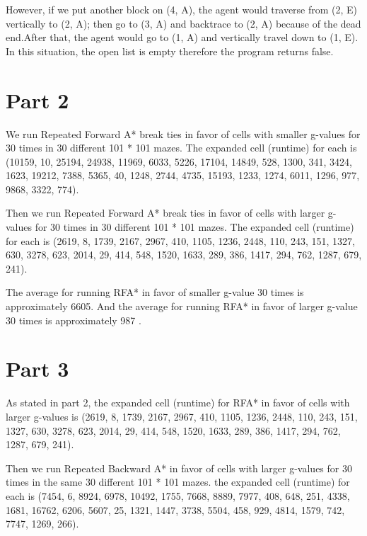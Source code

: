 \documentclass{article}
\begin{document}
However, if we put another block on (4, A), the agent would traverse from (2, E) vertically to (2, A); then go to (3, A) and backtrace to (2, A) because of the dead end.After that, the agent would go to (1, A) and vertically travel down to (1, E). In this situation, the open list is empty therefore the program returns false.

\section*{Part 2}
\hspace{5mm}

We run Repeated Forward A* break ties in favor of cells with smaller g-values for 30 times in 30 different 101 * 101 mazes. The expanded cell (runtime) for each is 
(10159, 10, 25194, 24938, 11969, 6033, 5226, 17104, 14849, 528, 1300, 341, 3424, 1623, 19212, 7388, 5365, 40, 1248, 2744, 4735, 15193, 1233, 1274, 6011, 1296, 977, 9868, 3322, 774).

Then we run Repeated Forward A* break ties in favor of cells with larger g-values for 30 times in 30 different 101 * 101 mazes. The expanded cell (runtime) for each is 
(2619, 8, 1739, 2167, 2967, 410, 1105, 1236, 2448, 110, 243, 151, 1327, 630, 3278, 623, 2014, 29, 414, 548, 1520, 1633, 289, 386, 1417, 294, 762, 1287, 679, 241).

The average for running RFA* in favor of smaller g-value 30 times is approximately 6605. And the average for running RFA* in favor of larger g-value 30 times is approximately 987 .



\section*{Part 3}
\hspace{5mm}

As stated in part 2, the expanded cell (runtime) for RFA* in favor of cells with larger g-values is
(2619, 8, 1739, 2167, 2967, 410, 1105, 1236, 2448, 110, 243, 151, 1327, 630, 3278, 623, 2014, 29, 414, 548, 1520, 1633, 289, 386, 1417, 294, 762, 1287, 679, 241).

Then we run Repeated Backward A* in favor of cells with larger g-values for 30 times in the same 30 different 101 * 101 mazes. the expanded cell (runtime) for each is 
(7454, 6, 8924, 6978, 10492, 1755, 7668, 8889, 7977, 408, 648, 251, 4338, 1681, 16762, 6206, 5607, 25, 1321, 1447, 3738, 5504, 458, 929, 4814, 1579, 742, 7747, 1269, 266).
\end{document}
